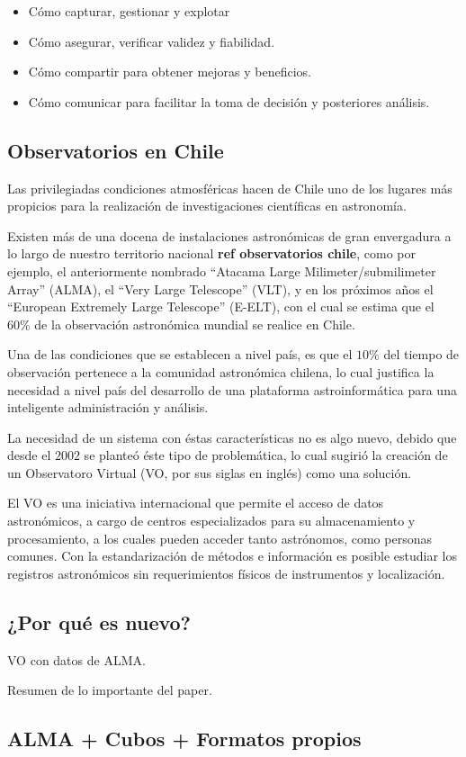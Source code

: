 \begin{itemize}
    \item Cómo capturar, gestionar y explotar
    \item Cómo asegurar, verificar validez y fiabilidad.
    \item Cómo compartir para obtener mejoras y beneficios.
    \item Cómo comunicar para facilitar la toma de decisión y posteriores análisis.
\end{itemize}

\subsection{Observatorios en Chile}

Las privilegiadas condiciones atmosféricas hacen de Chile uno de los lugares más
propicios para la realización de investigaciones científicas en astronomía.

Existen más de una docena de instalaciones astronómicas de gran envergadura a lo
largo de nuestro territorio nacional {\bf ref observatorios chile}, como por ejemplo,
el anteriormente nombrado ``Atacama Large Milimeter/submilimeter Array'' (ALMA),
el ``Very Large Telescope'' (VLT), y en los próximos años el ``European Extremely
Large Telescope'' (E-ELT), con el cual se estima que el $60\%$ de la observación
astronómica mundial se realice en Chile.

Una de las condiciones que se establecen a nivel país, es que el $10\%$ del tiempo
de observación pertenece a la comunidad astronómica chilena, lo cual justifica
la necesidad a nivel país del desarrollo de una plataforma astroinformática
para una inteligente administración y análisis.

La necesidad de un sistema con éstas características no es algo nuevo,
debido que desde el $2002$ se planteó éste tipo de problemática, lo cual sugirió
la creación de un Observatoro Virtual (VO, por sus siglas en inglés) como una solución.

El VO es una iniciativa internacional que permite el acceso de datos astronómicos,
a cargo de centros especializados para su almacenamiento y procesamiento,
a los cuales pueden acceder tanto astrónomos, como personas comunes.
Con la estandarización de métodos e información es posible estudiar los registros
astronómicos sin requerimientos físicos de instrumentos y localización.

\subsection{¿Por qué es nuevo?}
VO con datos de ALMA.

Resumen de lo importante del paper.



\subsection{ALMA + Cubos + Formatos propios}
